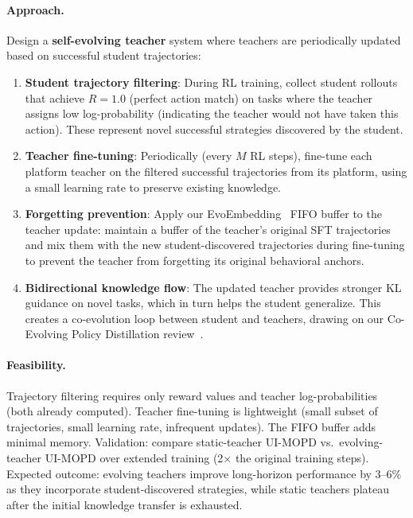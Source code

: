 \documentclass[11pt,a4paper]{article}
\begin{document}
\paragraph{Approach.} Design a \textbf{self-evolving teacher} system where teachers are periodically updated based on successful student trajectories:
\begin{enumerate}
\item \textbf{Student trajectory filtering}: During RL training, collect student rollouts that achieve $R = 1.0$ (perfect action match) on tasks where the teacher assigns low log-probability (indicating the teacher would not have taken this action). These represent novel successful strategies discovered by the student.
\item \textbf{Teacher fine-tuning}: Periodically (every $M$ RL steps), fine-tune each platform teacher on the filtered successful trajectories from its platform, using a small learning rate to preserve existing knowledge.
\item \textbf{Forgetting prevention}: Apply our EvoEmbedding~\cite{evoembedding2026} FIFO buffer to the teacher update: maintain a buffer of the teacher's original SFT trajectories and mix them with the new student-discovered trajectories during fine-tuning to prevent the teacher from forgetting its original behavioral anchors.
\item \textbf{Bidirectional knowledge flow}: The updated teacher provides stronger KL guidance on novel tasks, which in turn helps the student generalize. This creates a co-evolution loop between student and teachers, drawing on our Co-Evolving Policy Distillation review~\cite{coevolvingpd2026}.
\end{enumerate}

\paragraph{Feasibility.} Trajectory filtering requires only reward values and teacher log-probabilities (both already computed). Teacher fine-tuning is lightweight (small subset of trajectories, small learning rate, infrequent updates). The FIFO buffer adds minimal memory. Validation: compare static-teacher UI-MOPD vs.\ evolving-teacher UI-MOPD over extended training (2$\times$ the original training steps). Expected outcome: evolving teachers improve long-horizon performance by 3--6\% as they incorporate student-discovered strategies, while static teachers plateau after the initial knowledge transfer is exhausted.
\end{document}
